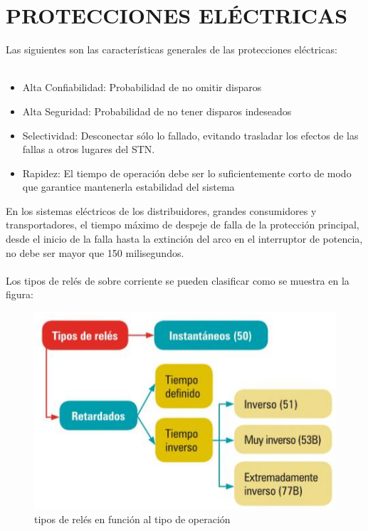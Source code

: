 \documentclass[a5paper]{book}%
\begin{document}
    \chapter{PROTECCIONES ELÉCTRICAS}

    Las siguientes son las características generales de las protecciones eléctricas:\\\\
\begin{itemize}
	\item Alta Confiabilidad: Probabilidad de no omitir disparos
	\item Alta Seguridad: Probabilidad de no tener disparos indeseados
	\item Selectividad: Desconectar sólo lo fallado, evitando trasladar los efectos de las fallas a otros lugares del STN. 
	\item Rapidez: El tiempo de operación debe ser lo suficientemente corto de modo que garantice mantenerla estabilidad del sistema
        \end{itemize}

        En los sistemas eléctricos de los distribuidores, grandes consumidores y transportadores, el tiempo máximo de despeje de falla de la protección principal, desde el inicio de la falla hasta la extinción del arco en el interruptor de potencia, no debe
        ser mayor que 150 milisegundos.\\\\

        Los tipos de relés de sobre corriente se pueden clasificar como se muestra en la figura:

\begin{figure}[H]
      \centering
      
      \caption{tipos de relés en función al tipo de operación}
      \label{fig:tiporele}
      \includegraphics[width=\linewidth]{tipos_rele}
    \end{figure}
\end{document}
